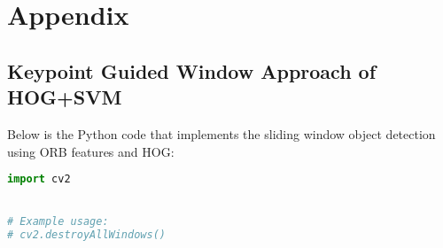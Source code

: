 \appendix
\chapter{Appendix}
\section{Keypoint Guided Window Approach of HOG+SVM }

Below is the Python code that implements the sliding window object detection using ORB features and HOG:

\begin{lstlisting}[language=Python, caption={Additional code}]
import cv2


# Example usage:
# cv2.destroyAllWindows()
\end{lstlisting}
